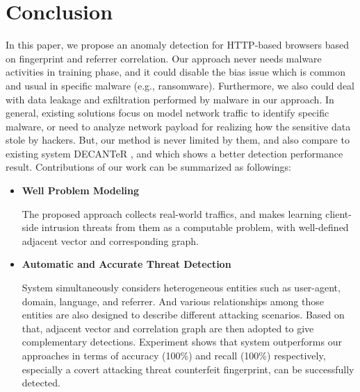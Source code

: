 \section{Conclusion}

In this paper, we propose an anomaly detection for HTTP-based browsers based on fingerprint and referrer correlation. Our approach never needs malware activities in training phase, and it could disable the bias issue which is common and usual in specific malware (e.g., ransomware). Furthermore, we also could deal with data leakage and exfiltration performed by malware in our approach. In general, existing solutions focus on model network traffic to identify specific malware, or need to analyze network payload for realizing how the sensitive data stole by hackers. But, our method is never limited by them, and also compare to existing system DECANTeR \cite{bortolameotti2017decanter}, and which shows a better detection performance result. Contributions of our work can be summarized as followings:

\begin{itemize}

\item {\bf Well Problem Modeling}

The proposed approach collects real-world traffics, and makes learning client-side intrusion threats from them as a computable problem, with well-defined adjacent vector and corresponding graph.  

\item {\bf Automatic and Accurate Threat Detection}

System simultaneously considers heterogeneous entities such as user-agent, domain, language, and referrer. And various relationships among those entities are also designed to describe different attacking scenarios. Based on that, adjacent vector and correlation graph are then adopted to give complementary detections. Experiment shows that system outperforms our approaches in terms of accuracy (100\%) and recall (100\%) respectively, especially a covert attacking threat counterfeit fingerprint, can be successfully detected.

\end{itemize}